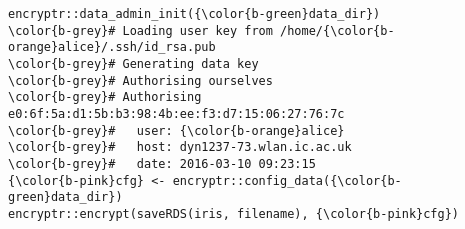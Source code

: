 \documentclass[class=minimal,border=0]{standalone}
\begin{document}
%
\begin{BVerbatim}[bgcolor=b-darkgrey]
encryptr::data_admin_init({\color{b-green}data_dir})
\color{b-grey}# Loading user key from /home/{\color{b-orange}alice}/.ssh/id_rsa.pub
\color{b-grey}# Generating data key
\color{b-grey}# Authorising ourselves
\color{b-grey}# Authorising e0:6f:5a:d1:5b:b3:98:4b:ee:f3:d7:15:06:27:76:7c
\color{b-grey}#   user: {\color{b-orange}alice}
\color{b-grey}#   host: dyn1237-73.wlan.ic.ac.uk
\color{b-grey}#   date: 2016-03-10 09:23:15
{\color{b-pink}cfg} <- encryptr::config_data({\color{b-green}data_dir})
encryptr::encrypt(saveRDS(iris, filename), {\color{b-pink}cfg})
\end{BVerbatim}
\end{document}
